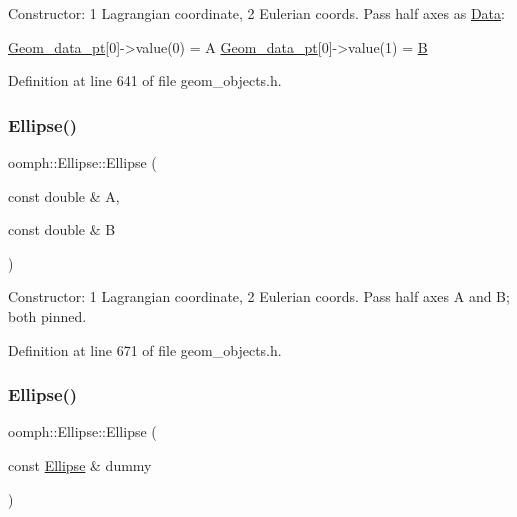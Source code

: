Constructor\+: 1 Lagrangian coordinate, 2 Eulerian coords. Pass half axes as \hyperlink{classoomph_1_1Data}{Data}\+: 


\begin{DoxyCode}
\hyperlink{classoomph_1_1Ellipse_ae46cd009a73386dc3423378d8a0065de}{Geom\_data\_pt}[0]->value(0) = A
\hyperlink{classoomph_1_1Ellipse_ae46cd009a73386dc3423378d8a0065de}{Geom\_data\_pt}[0]->value(1) = \hyperlink{namespaceoomph_1_1OcTreeNames_ae7e7e58298b85825061eeff362656c40a43c804e2bcf9862a4bf629d5f01761e8}{B}
\end{DoxyCode}
 

Definition at line 641 of file geom\+\_\+objects.\+h.

\mbox{\label{classoomph_1_1Ellipse_a23a5b259b37d9e41af6a6755d3b944cd}} 
\subsubsection{\texorpdfstring{Ellipse()}{Ellipse()}\hspace{0.1cm}{\footnotesize\ttfamily [2/3]}}
{\footnotesize\ttfamily oomph\+::\+Ellipse\+::\+Ellipse (\begin{DoxyParamCaption}\item[{const double \&}]{A,  }\item[{const double \&}]{B }\end{DoxyParamCaption})\hspace{0.3cm}{\ttfamily [inline]}}



Constructor\+: 1 Lagrangian coordinate, 2 Eulerian coords. Pass half axes A and B; both pinned. 



Definition at line 671 of file geom\+\_\+objects.\+h.

\mbox{\label{classoomph_1_1Ellipse_a80738b07be639f57804a8618ddc8da66}} 
\subsubsection{\texorpdfstring{Ellipse()}{Ellipse()}\hspace{0.1cm}{\footnotesize\ttfamily [3/3]}}
{\footnotesize\ttfamily oomph\+::\+Ellipse\+::\+Ellipse (\begin{DoxyParamCaption}\item[{const \hyperlink{classoomph_1_1Ellipse}{Ellipse} \&}]{dummy }\end{DoxyParamCaption})\hspace{0.3cm}{\ttfamily [inline]}}



